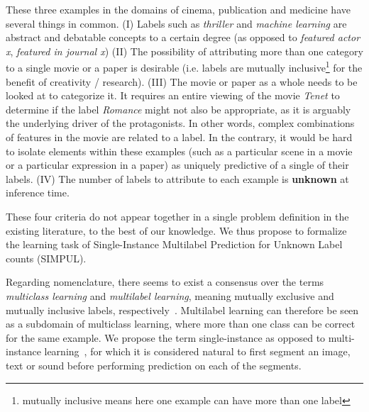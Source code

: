 These three examples in the domains of cinema, publication and medicine have several things in common. (I) Labels such as \textit{thriller} and \textit{machine learning} are abstract and debatable concepts to a certain degree (as opposed to \textit{featured actor x}, \textit{featured in journal x}) (II) The possibility of attributing more than one category to a single movie or a paper is desirable (i.e. labels are mutually inclusive\footnote{mutually inclusive means here one example can have more than one label} for the benefit of creativity / research). (III) The movie or paper as a whole needs to be looked at to categorize it. It requires an entire viewing of the movie \textit{Tenet} to determine if the label \textit{Romance} might not also be appropriate, as it is arguably the underlying driver of the protagonists. In other words, complex combinations of features in the movie are related to a label. In the contrary, it would be hard to isolate elements within these examples (such as a particular scene in a movie or a particular expression in a paper) as uniquely predictive of a single of their labels. (IV) The number of labels to attribute to each example is \textbf{unknown} at inference time.

These four criteria do not appear together in a single problem definition in the existing literature, to the best of our knowledge. We thus propose to formalize the learning task of Single-Instance Multilabel Prediction for Unknown Label counts (SIMPUL). 

Regarding nomenclature, there seems to exist a consensus over the terms \emph{multiclass learning} and \emph{multilabel learning}, meaning mutually exclusive and mutually inclusive labels, respectively~\cite{multilabelMethods}. Multilabel learning can therefore be seen as a subdomain of multiclass learning, where more than one class can be correct for the same example. We propose the term single-instance as opposed to multi-instance learning~\citep[e.g.,][]{multiInstance, multiInstanceMultiLabel}, for which it is considered natural to first segment an image, text or sound before performing prediction on each of the segments.

